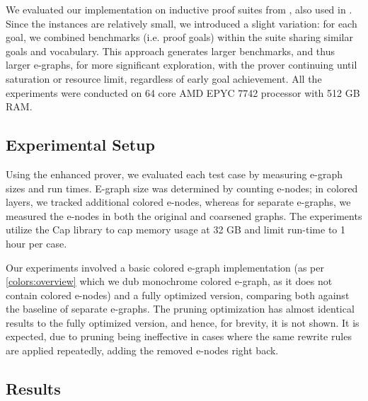 We evaluated our implementation on inductive proof suites from \cite{cvc4induction}, also used in \cite{thesy}. 
Since the instances are relatively small, we introduced a slight variation: for each goal, we combined benchmarks (i.e. proof goals) within the suite sharing similar goals and vocabulary.
This approach generates larger benchmarks, and thus larger e-graphs, for more significant exploration, with the prover continuing until saturation or resource limit, regardless of early goal achievement.
All the experiments were conducted on 64 core AMD EPYC 7742 processor with 512 GB RAM.

\subsection{Experimental Setup}

Using the enhanced prover, we evaluated each test case by measuring e-graph sizes and run times. 
E-graph size was determined by counting e-nodes; in colored layers, we tracked additional colored e-nodes, whereas for separate e-graphs, we measured the e-nodes in both the original and coarsened graphs.
The experiments utilize the Cap library to cap memory usage at 32 GB and limit run-time to 1 hour per case.

Our experiments involved a basic colored e-graph implementation (as per \autoref{colors:overview} which we dub monochrome colored e-graph, as it does not contain colored e-nodes) and a fully optimized version, comparing both against the baseline of separate e-graphs. 
The pruning optimization has almost identical results to the fully optimized version, and hence, for brevity, it is not shown. 
It is expected, due to pruning being ineffective in cases where the same rewrite rules are applied repeatedly, adding the removed e-nodes right back.


\subsection{Results}


